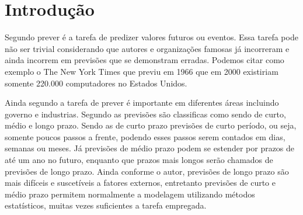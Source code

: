 \documentclass[
	12pt,
	oneside,
	a4paper,
	english,
	brazil
]{abntex2}
\begin{document}
\frenchspacing

\imprimircapa{}

\imprimirfolhaderosto{}

\textual{}

\tableofcontents*
\cleardoublepage

\chapter{Introdução}

Segundo  prever é a tarefa de predizer valores futuros ou 
eventos. Essa tarefa pode não ser trivial considerando que autores e 
organizações famosas já incorreram e ainda incorrem em previsões que se 
demonstram erradas.  Podemos citar como exemplo o The New York Times que previu 
em 1966 que em 2000 existiriam somente 220.000 computadores no Estados Unidos.

Ainda segundo  a tarefa de prever é importante em diferentes 
áreas incluindo governo e industrias. Segundo  as previsões 
são classificas como sendo de curto, médio e longo prazo.  Sendo as de curto 
prazo previsões de curto período, ou seja, somente poucos passos a frente, 
podendo esses passos serem contados em dias, semanas ou meses.  Já previsões de 
médio prazo podem se estender por prazos de até um ano no futuro, enquanto que 
prazos mais longos serão chamados de previsões de longo prazo. Ainda conforme o 
autor, previsões de longo prazo são mais difíceis e suscetíveis a fatores 
externos, entretanto previsões de curto e médio prazo permitem normalmente a 
modelagem utilizando métodos estatísticos, muitas vezes suficientes a tarefa 
empregada.

\postextual


\end{document}
